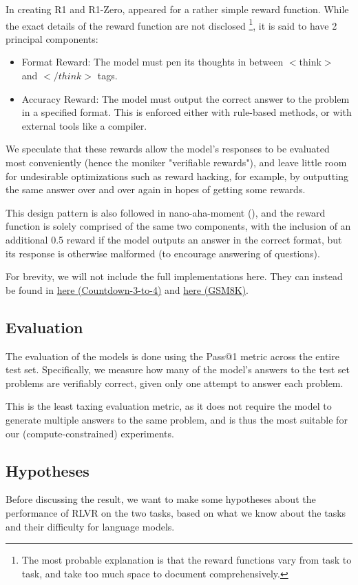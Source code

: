 \documentclass{article} %
\theoremstyle{definition}
\begin{document}
In creating R1 and R1-Zero, \cite{r1} appeared for a rather simple reward function.
While the exact details of the reward function are not disclosed \footnote{
    The most probable explanation is that the reward functions 
    vary from task to task, and take too much space to document comprehensively.
}, it is said to have 2 principal components:
\begin{itemize}
    \item Format Reward: The model must pen its thoughts in between $<$think$>$ and $</think>$ tags.
    \item Accuracy Reward: The model must output the correct answer to the problem in a specified format.
    This is enforced either with rule-based methods, or with external tools like a compiler.
\end{itemize}

We speculate that these rewards allow the model's responses to be evaluated most conveniently
(hence the moniker "verifiable rewards"), and leave little room for undesirable optimizations
such as reward hacking, for example, by outputting the same answer over and over again
in hopes of getting some rewards.

This design pattern is also followed in nano-aha-moment (\cite{nano-aha-moment}),
and the reward function is solely comprised of the same two components,
with the inclusion of an additional 0.5 reward if the model outputs an answer in the correct format,
but its response is otherwise malformed (to encourage answering of questions).

For brevity, we will not include the full implementations here. They can instead
be found in \href{../../code/nano-aha-moment/nano_r1_script.py}{here (Countdown-3-to-4)} and 
\href{../../code/nano-aha-moment/nano_r1_gsm8k.py}{here (GSM8K)}.

\subsection{Evaluation}
The evaluation of the models is done using the Pass@1 metric across the entire test set.
Specifically, we measure how many of the model's answers to the test set problems
are verifiably correct, given only one attempt to answer each problem.

This is the least taxing evaluation metric, as it does not require the model to
generate multiple answers to the same problem, and is thus the most suitable for our 
(compute-constrained) experiments.

\subsection{Hypotheses}
\label{sec:hypotheses}
Before discussing the result, we want to make some hypotheses about the performance of RLVR on the two tasks,
based on what we know about the tasks and their difficulty for language models.
\end{document}

